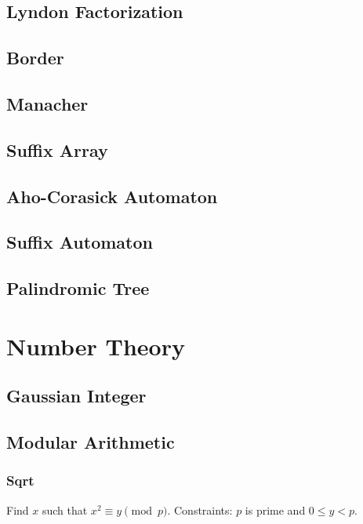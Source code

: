 \documentclass{article}
\begin{document}
\begin{multicols}{3}
    \subsection{Lyndon Factorization}
    
    \subsection{Border}
    
    \subsection{Manacher}
    
    \subsection{Suffix Array}
    
    \subsection{Aho-Corasick Automaton}
    
    \subsection{Suffix Automaton}
    
    \subsection{Palindromic Tree}
    

    \section{Number Theory}
    \subsection{Gaussian Integer}
    
    \subsection{Modular Arithmetic}
    \subsubsection{Sqrt}
    Find $x$ such that $x^2\equiv y\pmod p$.
    \newline Constraints: $p$ is prime and $0\le y<p$.
    

\end{multicols}
\end{document}
